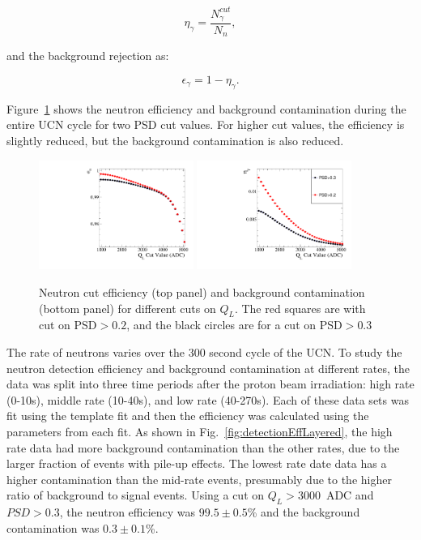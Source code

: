 \documentclass[twocolumn]{bmcart}
\begin{document}
\begin{equation}
\eta_{\gamma}= \frac{N_{\gamma}^{cut}}{N_n},
\end{equation}

\noindent and the background rejection as:

\begin{equation}
\epsilon_{\gamma} = 1 - \eta_{\gamma}.
\end{equation}

Figure~\ref{fig:detectionEff} shows the neutron efficiency and
background contamination during the entire UCN cycle for two PSD cut
values.  For higher cut values, the efficiency is slightly reduced,
but the background contamination is also reduced.


\begin{figure}[!htpb]
\centering \includegraphics[width =0.45\textwidth, angle=0]{figures/neutroneff.pdf}
\centering \includegraphics[width =0.45\textwidth, angle=0]{figures/backgroundconta.pdf}
\caption{ Neutron cut efficiency (top panel) and background
  contamination (bottom panel) for different cuts on $Q_L$.  The red
  squares are with cut on PSD$>0.2$, and the black circles are for a
  cut on PSD$>0.3$ }
\label{fig:detectionEff}
\end{figure}

The rate of neutrons varies over the 300 second cycle of the UCN.  To
study the neutron detection efficiency and background contamination at
different rates, the data was split into three time periods after the
proton beam irradiation: high rate (0-10s), middle rate (10-40s), and
low rate (40-270s).  Each of these data sets was fit using the
template fit and then the efficiency was calculated using the
parameters from each fit.  As shown in
Fig.~\ref{fig:detectionEffLayered}, the high rate data had more
background contamination than the other rates, due to the larger
fraction of events with pile-up effects.  The lowest rate date data
has a higher contamination than the mid-rate events, presumably due to
the higher ratio of background to signal events.  Using a cut on $Q_L
> 3000$~ADC and $PSD>0.3$, the neutron efficiency was $99.5\pm0.5$\%
and the background contamination was $0.3\pm0.1$\%.
\end{document}
